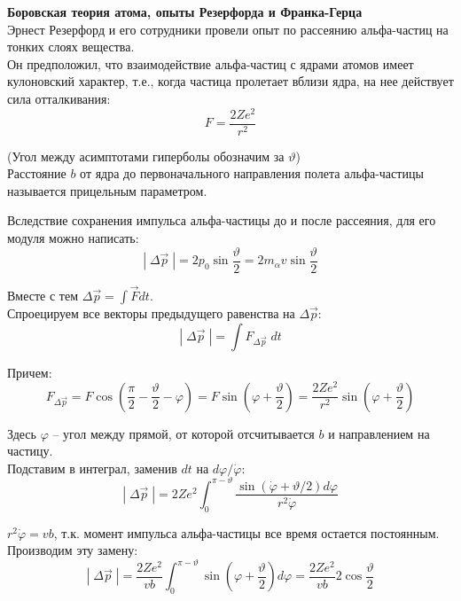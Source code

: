 \documentclass{article}
\begin{document}
	\textbf{Боровская теория атома, опыты Резерфорда и Франка-Герца}\\

	Эрнест Резерфорд и его сотрудники провели опыт по рассеянию альфа-частиц на тонких слоях вещества.\\

	Он предположил, что взаимодействие альфа-частиц с ядрами атомов имеет кулоновский характер, т.е., когда частица пролетает вблизи ядра, на нее действует сила отталкивания:
	\begin{equation}
		F = \frac{2Ze^2}{r^2}
	\end{equation}

	(Угол между асимптотами гиперболы обозначим за $\vartheta$)\\

	Расстояние $b$ от ядра до первоначального направления полета альфа-частицы называется прицельным параметром.

	Вследствие сохранения импульса альфа-частицы до и после рассеяния, для его модуля можно написать:
	\begin{equation}
		|\;\Delta\vec p\;| = 2p_0\sin\frac{\vartheta}{2} = 2m_\alpha v\sin\frac{\vartheta}{2}
	\end{equation}

	Вместе с тем $\Delta \vec p = \int\vec F dt$.\\

	Спроецируем все векторы предыдущего равенства на $\Delta \vec p$:
	\begin{equation}
		|\;\Delta\vec p\;| = \int F_{\Delta\vec p}\;dt
	\end{equation}

	Причем:
	\begin{equation}
		F_{\Delta\vec p} = F\cos(\frac{\pi}{2}-\frac{\vartheta}{2}-\varphi) = F\sin(\varphi+\frac{\vartheta}{2}) = \frac{2Ze^2}{r^2}\sin(\varphi+\frac{\vartheta}{2})
	\end{equation}

	Здесь $\varphi$ -- угол между прямой, от которой отсчитывается $b$ и направлением на частицу.\\

	Подставим в интеграл, заменив $dt$ на $d\varphi/\dot\varphi$:
	\begin{equation}
		|\;\Delta\vec p\;| = 2Ze^2\int_0^{\pi-\vartheta}\frac{\sin(\dot\varphi+\vartheta/2)d\varphi}{r^2\dot\varphi}
	\end{equation}

	$r^2\dot\varphi=vb$, т.к. момент импульса альфа-частицы все время остается постоянным. Производим эту замену:
	\begin{equation}
		|\;\Delta\vec p\;| = \frac{2Ze^2}{vb}\int_0^{\pi-\vartheta}\sin(\varphi+\frac{\vartheta}{2})d\varphi = \frac{2Ze^2}{vb}2\cos\frac{\vartheta}{2}
	\end{equation}
\end{document}
